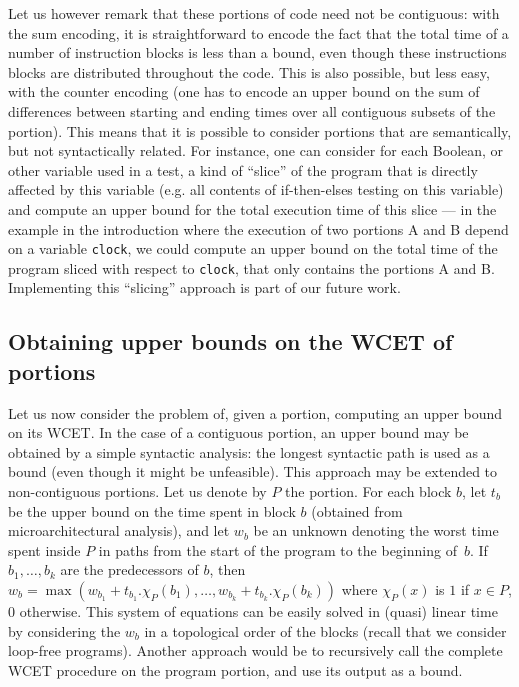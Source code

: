 \documentclass[a4paper,twocolumn,11pt]{article}
\begin{document}
Let us however remark that these portions of code need not be contiguous: with the sum encoding, it is straightforward to encode the fact that the total time of a number of instruction blocks is less than a bound, even though these instructions blocks are distributed throughout the code.
This is also possible, but less easy, with the counter encoding (one has to encode an upper bound on the sum of differences between starting and ending times over all contiguous subsets of the portion).
This means that it is possible to consider portions that are semantically, but not syntactically related.
For instance, one can consider for each Boolean, or other variable used in a test, a kind of ``slice'' of the program that is directly affected by this variable (e.g. all contents of if-then-elses testing on this variable) and compute an upper bound for the total execution time of this slice --- in the example in the introduction where the execution of two portions A and B depend on a variable \lstinline|clock|, we could compute an upper bound on the total time of the program sliced with respect to \lstinline|clock|, that only contains the portions A and B.
Implementing this ``slicing'' approach is part of our future work.

\subsection{Obtaining upper bounds on the WCET of portions}

Let us now consider the problem of, given a portion, computing an upper bound on its WCET.
In the case of a contiguous portion, an upper bound may be obtained by a simple syntactic analysis: the longest syntactic path is used as a bound (even though it might be unfeasible).
This approach may be extended to non-contiguous portions. Let us denote by $P$ the portion. For each block $b$, let $t_b$ be the upper bound on the time spent in block $b$ (obtained from microarchitectural analysis), and let $w_b$ be an unknown denoting the worst time spent inside $P$ in paths from the start of the program to the beginning of~$b$. If $b_1,\dots,b_k$ are the predecessors of $b$, then $w_b = \max(w_{b_1}+t_{b_1}.\chi_P(b_1), \dots, w_{b_k}+t_{b_k}.\chi_P(b_k))$ where $\chi_P(x)$ is $1$ if $x \in P$, $0$ otherwise.
This system of equations can be easily solved in (quasi) linear time by considering the $w_b$ in a topological order of the blocks (recall that we consider loop-free programs).
Another approach would be to recursively call the complete WCET procedure on the program portion, and use its output as a bound. 
\end{document}
